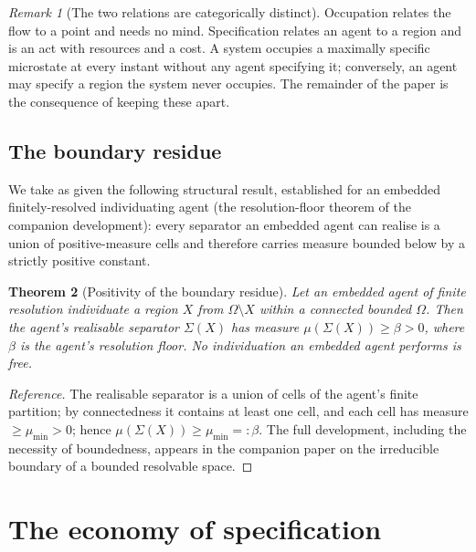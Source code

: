 \documentclass[11pt,a4paper]{article}
\theoremstyle{thmstyle}
\newtheorem{theorem}{Theorem}[section]
\theoremstyle{definition}
\theoremstyle{remark}
\newtheorem{remark}[theorem]{Remark}
\newcommand{\Space}{\Omega}
\newcommand{\floorc}{\beta}
\begin{document}
\begin{remark}[The two relations are categorically distinct]
\label{rem:two-relations}
Occupation relates the flow to a point and needs no mind. Specification relates
an agent to a region and is an act with resources and a cost. A system occupies
a maximally specific microstate at every instant without any agent specifying it;
conversely, an agent may specify a region the system never occupies. The
remainder of the paper is the consequence of keeping these apart.
\end{remark}

\subsection{The boundary residue}

We take as given the following structural result, established for an embedded
finitely-resolved individuating agent (the resolution-floor theorem of the
companion development): every separator an embedded agent can realise is a union
of positive-measure cells and therefore carries measure bounded below by a
strictly positive constant.

\begin{theorem}[Positivity of the boundary residue]
\label{thm:floor}
Let an embedded agent of finite resolution individuate a region $X$ from
$\Space\setminus X$ within a connected bounded $\Space$. Then the agent's
realisable separator $\Sigma(X)$ has measure
$\mu(\Sigma(X))\ge\floorc>0$, where $\floorc$ is the agent's resolution floor.
No individuation an embedded agent performs is free.
\end{theorem}

\begin{proof}[Reference]
The realisable separator is a union of cells of the agent's finite partition;
by connectedness it contains at least one cell, and each cell has measure
$\ge\mu_{\min}>0$; hence $\mu(\Sigma(X))\ge\mu_{\min}=:\floorc$. The full
development, including the necessity of boundedness, appears in the companion
paper on the irreducible boundary of a bounded resolvable space.
\end{proof}

\section{The economy of specification}
\label{sec:spec}
\end{document}
